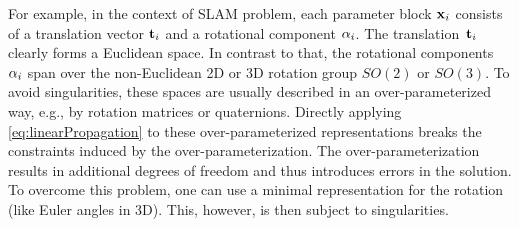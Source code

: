 \documentclass[a4paper]{article}
\begin{document}
For example, in the context of SLAM problem, each parameter block
$\mathbf{x}_i$ consists of a translation vector $\mathbf{t}_i$ and a rotational
component $\mathbf{\alpha}_i$. The translation~$\mathbf{t}_i$ clearly forms a Euclidean
space. In contrast to that, the rotational components~$\mathbf{\alpha}_i$ span
over the non-Euclidean 2D or 3D rotation group $SO(2)$ or $SO(3)$.  To
avoid singularities, these spaces are usually described in an
over-parameterized way, e.g., by rotation matrices or quaternions.
Directly applying \eqref{eq:linearPropagation} to these
over-parameterized representations breaks the constraints induced by the
over-parameterization. The over-parameterization results in additional
degrees of freedom and thus introduces errors in the solution.  To
overcome this problem, one can use a minimal representation for the
rotation (like Euler angles in 3D). This, however, is then subject to
singularities.
\end{document}
